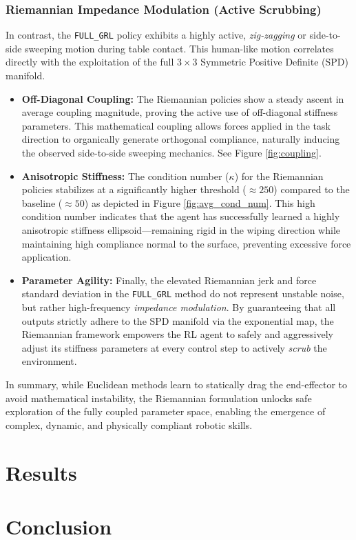 \documentclass[letterpaper, 10 pt, conference]{IEEEtran}
\begin{document}
\subsubsection*{Riemannian Impedance Modulation (Active Scrubbing)}
In contrast, the \texttt{FULL\_GRL} policy exhibits a highly active, \textit{zig-zagging} or side-to-side sweeping motion during table contact. This human-like motion correlates directly with the exploitation of the full $3 \times 3$ Symmetric Positive Definite (SPD) manifold. 

\begin{itemize}
    \item \textbf{Off-Diagonal Coupling:} The Riemannian policies show a steady ascent in average coupling magnitude, proving the active use of off-diagonal stiffness parameters. This mathematical coupling allows forces applied in the task direction to organically generate orthogonal compliance, naturally inducing the observed side-to-side sweeping mechanics. See Figure \ref{fig:coupling}.
    \item \textbf{Anisotropic Stiffness:} The condition number ($\kappa$) for the Riemannian policies stabilizes at a significantly higher threshold ($\approx 250$) compared to the baseline ($\approx 50$) as depicted in Figure \ref{fig:avg_cond_num}. This high condition number indicates that the agent has successfully learned a highly anisotropic stiffness ellipsoid---remaining rigid in the wiping direction while maintaining high compliance normal to the surface, preventing excessive force application.
    \item \textbf{Parameter Agility:} Finally, the elevated Riemannian jerk and force standard deviation in the \texttt{FULL\_GRL} method do not represent unstable noise, but rather high-frequency \textit{impedance modulation}. By guaranteeing that all outputs strictly adhere to the SPD manifold via the exponential map, the Riemannian framework empowers the RL agent to safely and aggressively adjust its stiffness parameters at every control step to actively \textit{scrub} the environment.
\end{itemize}

In summary, while Euclidean methods learn to statically drag the end-effector to avoid mathematical instability, the Riemannian formulation unlocks safe exploration of the fully coupled parameter space, enabling the emergence of complex, dynamic, and physically compliant robotic skills. 


\section{Results}

\section{Conclusion}




\end{document}
